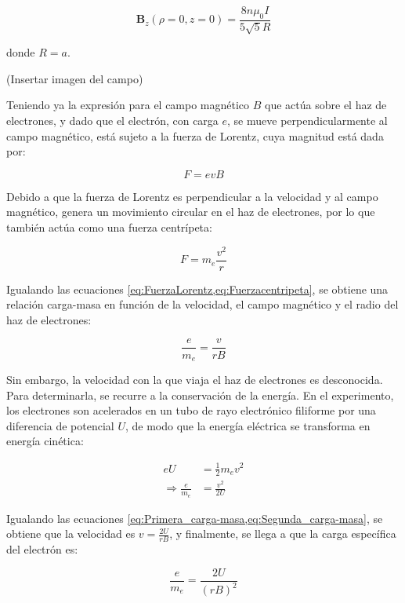 \begin{equation}
    \mathbf{B}_{z}(\rho=0, z=0) = \frac{8 n \mu_{0} I}{5 \sqrt{5} R}
    \label{eq:Campo_magnetico_enHaz}
\end{equation}

donde \( R = a \).

(Insertar imagen del campo)

Teniendo ya la expresión para el campo magnético \( B \) que actúa sobre el haz de electrones, y dado que el electrón, con carga \( e \), se mueve perpendicularmente al campo magnético, está sujeto a la fuerza de Lorentz, cuya magnitud está dada por:

\begin{equation}
    F = e v B
    \label{eq:FuerzaLorentz}
\end{equation}

Debido a que la fuerza de Lorentz es perpendicular a la velocidad y al campo magnético, genera un movimiento circular en el haz de electrones, por lo que también actúa como una fuerza centrípeta:

\begin{equation}
    F = m_{e} \frac{v^{2}}{r}
    \label{eq:Fuerzacentripeta}
\end{equation}

Igualando las ecuaciones \cref{eq:FuerzaLorentz,eq:Fuerzacentripeta}, se obtiene una relación carga-masa en función de la velocidad, el campo magnético y el radio del haz de electrones:

\begin{equation}
    \frac{e}{m_{e}} = \frac{v}{r B}
    \label{eq:Primera_carga-masa}
\end{equation}

Sin embargo, la velocidad con la que viaja el haz de electrones es desconocida. Para determinarla, se recurre a la conservación de la energía. En el experimento, los electrones son acelerados en un tubo de rayo electrónico filiforme por una diferencia de potencial \( U \), de modo que la energía eléctrica se transforma en energía cinética:

\begin{equation}
\begin{aligned}
    e U &= \frac{1}{2} m_{e} v^{2} \\
    \Rightarrow \frac{e}{m_{e}} &= \frac{v^{2}}{2 U}
\end{aligned}
\label{eq:Segunda_carga-masa}
\end{equation}

Igualando las ecuaciones \cref{eq:Primera_carga-masa,eq:Segunda_carga-masa}, se obtiene que la velocidad es \( v = \frac{2 U}{r B} \), y finalmente, se llega a que la carga específica del electrón es:

\begin{equation}
    \frac{e}{m_{e}} = \frac{2 U}{(r B)^{2}}
    \label{eq:carga-masa}
\end{equation}









